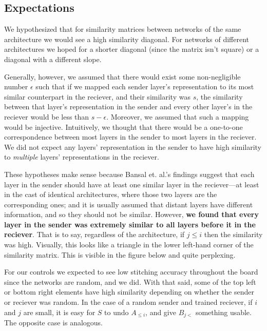 \documentclass{article}
\begin{document}
\subsection{Expectations}
We hypothesized that for similarity matrices between networks of the same architecture we would
see a high similarity diagonal. For networks of different architectures we hoped for a shorter diagonal
(since the matrix isn't square) or a diagonal with a different slope.

Generally, however, we assumed
that there would exist some non-negligible number $\epsilon$ such that if we mapped each
sender layer's representation to its most similar counterpart in the reciever,
and their similarity was $s$, the similarity between that layer's representation 
in the sender and every other layer's in the reciever would be
less than $s - \epsilon$. Moreover, we assumed that such a mapping would be injective. Intuitively,
we thought that there would be a one-to-one correspondence between most layers in the sender
to most layers in the reciever. We did not expect any layers' representation in the sender to have 
high similarity to \textit{multiple} layers' representations in the reciever.

These hypotheses make sense because Bansal et. al.'s findings suggest that each layer in the sender
should have at least one similar layer in the reciever---at least in the cast of identical architectures,
where those two layers are the corresponding ones; and it is usually assumed that distant layers
have different information, and so they should not be similar. However, \textbf{we found that every
layer in the sender was extremely similar to all layers before it in the reciever}. That is to say,
regardless of the architecture, if $j \leq i$ then the similarity was high. Visually, this looks
like a triangle in the lower left-hand corner of the similarity matrix. This is visible in the figure
below and quite perplexing.

For our controls we expected to see low stitching accuracy throughout the board since the networks are random,
and we did. With that said, some of the top left or bottom right elements have high similarity depending on
whether the sender or reciever was random. In the case of a random sender and trained reciever, if $i$ and $j$
are small, it is easy for $S$ to undo $A_{\leq i}$, and give $B_{j<}$ something usable. The opposite
case is analogous.
\end{document}

